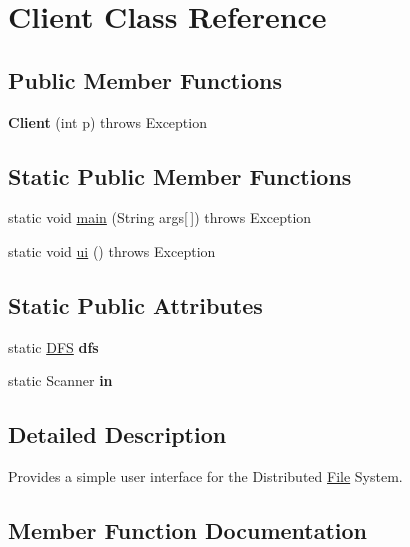 \hypertarget{class_client}{}\section{Client Class Reference}
\label{class_client}
\subsection*{Public Member Functions}
\begin{DoxyCompactItemize}
\item 
\mbox{\label{class_client_acfd1d72bb41aa7e44b83f6f87c4ba52e}} 
{\bfseries Client} (int p)  throws Exception 
\end{DoxyCompactItemize}
\subsection*{Static Public Member Functions}
\begin{DoxyCompactItemize}
\item 
static void \hyperlink{class_client_ac4219c51358857184ceeb023ada3d8ae}{main} (String args\mbox{[}$\,$\mbox{]})  throws Exception 
\item 
static void \hyperlink{class_client_a5a2336b78c9168bbfe9fb6664b4d5fb0}{ui} ()  throws Exception 
\end{DoxyCompactItemize}
\subsection*{Static Public Attributes}
\begin{DoxyCompactItemize}
\item 
\mbox{\label{class_client_a8a97d1d8ca81a411db565ca102408666}} 
static \hyperlink{class_d_f_s}{D\+FS} {\bfseries dfs}
\item 
\mbox{\label{class_client_ab8196da3c400a54c061e219bb721cbd3}} 
static Scanner {\bfseries in}
\end{DoxyCompactItemize}


\subsection{Detailed Description}
Provides a simple user interface for the Distributed \hyperlink{class_file}{File} System. 

\subsection{Member Function Documentation}
\mbox{\label{class_client_ac4219c51358857184ceeb023ada3d8ae}} 
